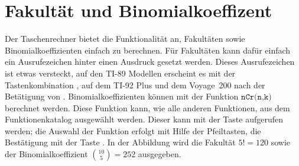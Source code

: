 \documentclass[a4paper,11pt,notitlepage,halfparskip,headsepline,normalheadings,twoside]{scrartcl}
\newlength{\tikey}
\newcommand{\keystroke}[1]{\settowidth{\tikey}{\scriptsize #1}\psframebox[framearc=0.2]{\parbox{\tikey}{\scriptsize\textsf{#1}}}}
\begin{document}
\section{Fakultät und Binomialkoeffizent}
\begin{window}
Der Taschenrechner bietet die Funktionalität an, Fakultäten sowie
Binomialkoeffizienten einfach zu berechnen. Für Fakultäten kann dafür einfach
ein Ausrufezeichen hinter einen Ausdruck gesetzt werden. Dieses Ausrufezeichen
ist etwas versteckt, auf den TI-89 Modellen erscheint es mit der
Tastenkombination \keystroke{$\blacklozenge$}\keystroke{$\div$}, auf dem TI-92 Plus
und dem Voyage\texttrademark~200 nach der Betätigung von
\keystroke{2nd}\keystroke{W}. Binomialkoeffizienten können mit der Funktion
$\texttt{nCr(n,k)}$ berechnet werden. Diese Funktion kann, wie alle anderen
Funktionen, aus dem Funktionenkatalog ausgewählt werden. Dieser kann mit der
Taste \keystroke{CATALOG} aufgerufen werden; die Auswahl der Funktion erfolgt
mit Hilfe der Pfeiltasten, die Bestätigung mit der Taste \keystroke{ENTER}. In
der Abbildung wird die Fakultät $5!=120$ sowie der Binomialkoeffizient
${10\choose 5}=252$ ausgegeben.
\end{window}
\end{document}
